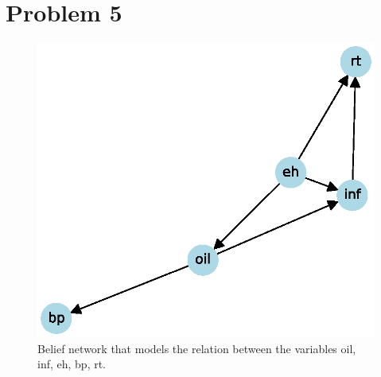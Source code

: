 \documentclass[12pt]{report}
\begin{document}






\section*{Problem 5}

\begin{figure}[H]
    \centering
    \includegraphics[width=0.65\linewidth]{P5_graph.eps}%
    \caption{Belief network that models the relation between the variables oil, inf, eh, bp, rt.}
\end{figure}
\end{document}
